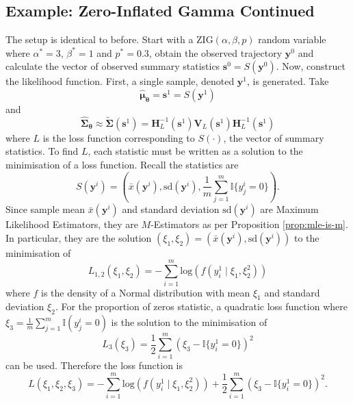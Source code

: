 \subsection{Example: Zero-Inflated Gamma Continued}
The setup is identical to before. Start with a $\text{ZIG}(\alpha, \beta, p)$ random variable where $\alpha^*=3$, $\beta^*=1$ and $p^*=0.3$, obtain the observed trajectory $\pmb{y}^0$ and calculate the vector of observed summary statistics $\pmb{s}^0 = S(\pmb{y}^0)$. Now, construct the likelihood function. First, a single sample, denoted $\pmb{y}^1$, is generated. Take
\begin{equation}
\hat{\pmb{\mu}}_{\pmb{\theta}} = \pmb{s}^1 = S(\pmb{y}^1)
\end{equation}
and
\begin{equation}
\hat{\pmb{\Sigma}}_{\pmb{\theta}} \approx \tilde{\pmb{\Sigma}}(\pmb{s}^1) = \pmb{H}_L^{-1}(\pmb{s}^1) \pmb{V}_{L}(\pmb{s}^1) \pmb{H}_{L}^{-1}(\pmb{s}^1)
\end{equation}
where $L$ is the loss function corresponding to $S(\cdot)$, the vector of summary statistics.
To find $L$, each statistic must be written as a solution to the minimisation of a loss function. Recall the statistics are
\begin{equation}
S(\pmb{y}^i) = (\bar{x}(\pmb{y}^i), \text{sd}(\pmb{y}^i), \frac{1}{m}\sum_{j=1}^m \mathbb{I}\{y^i_j = 0\}).
\end{equation}
Since sample mean $\bar{x}(\pmb{y}^i)$ and standard deviation $\text{sd}(\pmb{y}^i)$ are Maximum Likelihood Estimators, they are $M$-Estimators as per Proposition \ref{prop:mle-is-m}. In particular, they are the solution $(\xi_1, \xi_2) = (\bar{x}(\pmb{y}^i), \text{sd}(\pmb{y}^i))$ to the minimisation of
\begin{equation}
L_{1,2}(\xi_1, \xi_2) = -\sum_{i=1}^m \text{log}(f(y_i^1 \mid \xi_1, \xi_2^2))
\end{equation}
where $f$ is the density of a Normal distribution with mean $\xi_1$ and standard deviation $\xi_2$. For the proportion of zeros statistic, a quadratic loss function where $\xi_3 = \frac{1}{m}\sum_{j=1}^m \mathbb{I}(y^i_j = 0)$ is the solution to the minimisation of
\begin{equation}
L_3(\xi_3) = \frac{1}{2} \sum_{i=1}^m (\xi_3 - \mathbb{I}\{y^1_i = 0\})^2
\end{equation}
can be used. Therefore the loss function is
\begin{equation}
L(\xi_1, \xi_2, \xi_3) =  -\sum_{i=1}^m \text{log}(f(y_i^1 \mid \xi_1, \xi_2^2)) + \frac{1}{2} \sum_{i=1}^m (\xi_3 - \mathbb{I}\{y^1_i = 0\})^2.
\end{equation}
